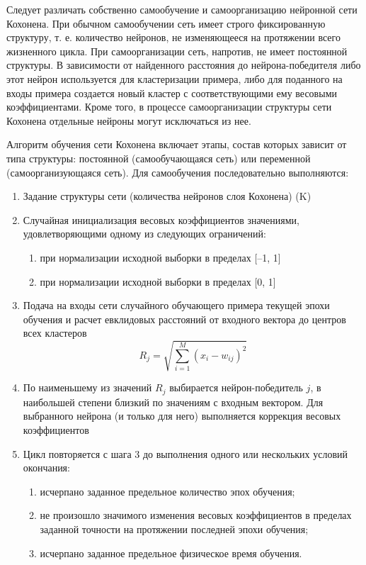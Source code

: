 \documentclass[paper=a4, fontsize=11pt]{scrartcl} %
\numberwithin{equation}{section} %
\numberwithin{figure}{section} %
\numberwithin{table}{section} %
\begin{document}
	Следует различать собственно самообучение и самоорганизацию нейронной сети Кохонена. При обычном самообучении сеть имеет строго фиксированную структуру, т. е. количество нейронов, не изменяющееся на протяжении всего жизненного цикла. При самоорганизации сеть, напротив, не имеет постоянной структуры. В зависимости от найденного расстояния до нейрона-победителя либо этот нейрон используется для кластеризации примера, либо для поданного на входы примера создается новый кластер с соответствующими ему весовыми коэффициентами. Кроме того, в процессе самоорганизации структуры сети Кохонена отдельные нейроны могут исключаться из нее.

	Алгоритм обучения сети Кохонена включает этапы, состав которых зависит от типа структуры: постоянной (самообучающаяся сеть) или переменной (самоорганизующаяся сеть). Для самообучения последовательно выполняются:
	
	\begin{enumerate}
		\item Задание структуры сети (количества нейронов слоя Кохонена) (K)
		\item Случайная инициализация весовых коэффициентов значениями, удовлетворяющими одному из следующих ограничений:
		\begin{enumerate}
			\item при нормализации исходной выборки в пределах [–1, 1]
			\item при нормализации исходной выборки в пределах [0, 1]
		\end{enumerate}
		\item Подача на входы сети случайного обучающего примера текущей эпохи обучения и расчет евклидовых расстояний от входного вектора до центров всех кластеров 
		\begin{equation}
			R_j = \sqrt{\sum_{i = 1}^{M}(x_i - w_{ij})^2}
			\label{R}
		\end{equation}
		\item По наименьшему из значений $R_j$ выбирается нейрон-победитель $j$, в наибольшей степени близкий по значениям с входным вектором. Для выбранного нейрона (и только для него) выполняется коррекция весовых коэффициентов
		\item Цикл повторяется с шага 3 до выполнения одного или нескольких условий окончания:
		\begin{enumerate}
			\item исчерпано заданное предельное количество эпох обучения;
			\item не произошло значимого изменения весовых коэффициентов в пределах заданной точности на протяжении последней эпохи обучения;
			\item исчерпано заданное предельное физическое время обучения.
		\end{enumerate}
	\end{enumerate}
\end{document}
